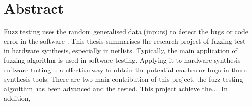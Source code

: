 \renewcommand{\baselinestretch}{1.5}
\chapter{Abstract}
\renewcommand{\baselinestretch}{\mystretch}

Fuzz testing uses the random generalised data (inputs) to detect the bugs or code error in the software \cite{miller2007fuzz}.
This thesis summarises 
the research project of fuzzing test in hardware synthesis, especially in netlists. Typically, the main application of fuzzing algorithm is used in software testing. Applying it to hardware synthesis software testing is a effective way to obtain the potential crashes or bugs in these synthesis tools. There are two main contribution of this project, the fuzz testing algorithm
has been advanced and the tested. This project achieve the....
In addition, 








